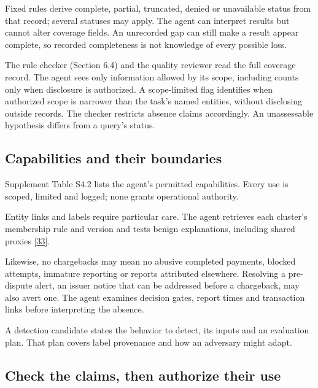 \documentclass[acmlarge,review,anonymous,nonacm]{acmart}
\begin{document}
Fixed rules derive complete, partial, truncated, denied or unavailable
status from that record; several statuses may apply. The agent can
interpret results but cannot alter coverage fields. An unrecorded gap
can still make a result appear complete, so recorded completeness is not
knowledge of every possible loss.

The rule checker (Section 6.4) and the quality reviewer read the full
coverage record. The agent sees only information allowed by its scope,
including counts only when disclosure is authorized. A scope-limited
flag identifies when authorized scope is narrower than the task's named
entities, without disclosing outside records. The checker restricts
absence claims accordingly. An unassessable hypothesis differs from a
query's status.

\hypertarget{capabilities-and-their-boundaries}{%
\subsection{Capabilities and their
boundaries}\label{capabilities-and-their-boundaries}}

Supplement Table S4.2 lists the agent's permitted capabilities. Every
use is scoped, limited and logged; none grants operational authority.

Entity links and labels require particular care. The agent retrieves
each cluster's membership rule and version and tests benign
explanations, including shared proxies
{[}\protect\hyperlink{ref-Liu2018GEM}{33}{]}.

Likewise, no chargebacks may mean no abusive completed payments, blocked
attempts, immature reporting or reports attributed elsewhere. Resolving
a pre-dispute alert, an issuer notice that can be addressed before a
chargeback, may also avert one. The agent examines decision gates,
report times and transaction links before interpreting the absence.

A detection candidate states the behavior to detect, its inputs and an
evaluation plan. That plan covers label provenance and how an adversary
might adapt.

\hypertarget{check-the-claims-then-authorize-their-use}{%
\subsection{Check the claims, then authorize their
use}\label{check-the-claims-then-authorize-their-use}}
\end{document}
